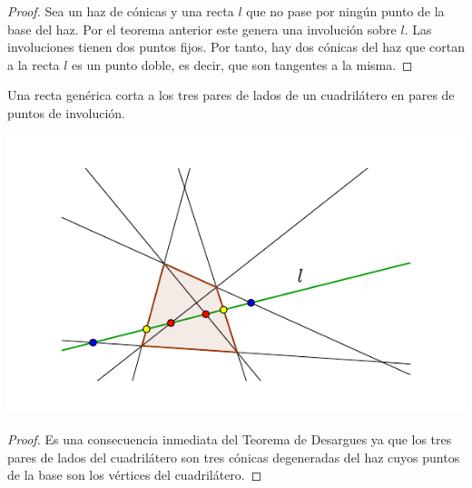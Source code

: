 \begin{proof}
	Sea un haz de cónicas y una recta $l$ que no pase por ningún punto de la base del haz. Por el teorema anterior este genera una involución sobre $l$. Las involuciones tienen dos puntos fijos. Por tanto, hay dos cónicas del haz que cortan a la recta $l$ es un punto doble, es decir, que son tangentes a la misma.
\end{proof}
\begin{cor}
	Una recta genérica corta a los tres pares de lados de un cuadrilátero en pares de puntos de involución.
	\begin{center}
		\includegraphics[scale=1]{Graficos/Conicas/CorolarioDesargues}
	\end{center}
\end{cor}
\begin{proof}
	Es una consecuencia inmediata del Teorema de Desargues ya que los tres pares de lados del cuadrilátero son tres cónicas degeneradas del haz cuyos puntos de la base son los vértices del cuadrilátero.
\end{proof}
